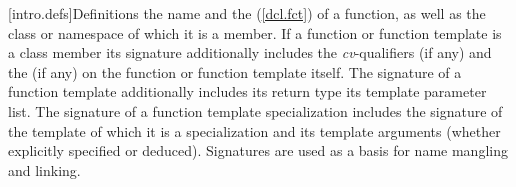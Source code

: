 \documentclass[american]{book}
\begin{document}
\begin{paras}
\setcounter{section}{2}
[intro.defs]{Definitions}
\setcounter{Paras}{10}
%
{the name and the 
(\mbox{\ref{dcl.fct}}) of a function, as well as the class or namespace 
of which it is a member. If a function or function template is a class
member its signature additionally includes the
\mbox{\textit{cv}}-qualifiers (if any) and the
 (if any) on the function or function
template itself.
 The signature of a function template additionally
includes its return type\mbox{} its template parameter 
list\mbox{}.
The signature
of a function template specialization includes the signature of the
template of which it is a specialization and its template arguments
(whether explicitly specified or deduced). \mbox{\enternote}Signatures
are used as a basis for name mangling and linking.\mbox{\exitnote} }
\end{paras}
\end{document}
